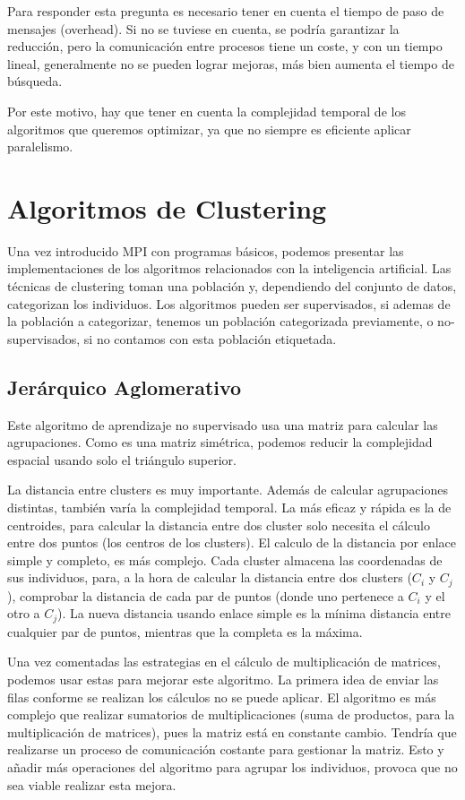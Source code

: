 	Para responder esta pregunta es necesario tener en cuenta el tiempo de paso de mensajes (overhead). Si no se tuviese en cuenta, se podría garantizar la reducción, pero la comunicación entre procesos tiene un coste, y con un tiempo lineal, generalmente no se pueden lograr mejoras, más bien aumenta el tiempo de búsqueda. 
	
	Por este motivo, hay que tener en cuenta la complejidad temporal de los algoritmos que queremos optimizar, ya que no siempre es eficiente aplicar paralelismo.


\section{Algoritmos de Clustering}

	Una vez introducido MPI con programas básicos, podemos presentar las implementaciones de los algoritmos relacionados con la inteligencia artificial. Las técnicas de clustering toman una población y, dependiendo del conjunto de datos, categorizan los individuos. Los algoritmos pueden ser supervisados, si ademas de la población a categorizar, tenemos un población categorizada previamente, o no-supervisados, si no contamos con esta población etiquetada.

	\subsection{Jerárquico Aglomerativo}
	\label{cap:3_2_1}
		Este algoritmo de aprendizaje no supervisado usa una matriz para calcular las agrupaciones. Como es una matriz simétrica, podemos reducir la complejidad espacial usando solo el triángulo superior. 
		
		La distancia entre clusters es muy importante. Además de calcular agrupaciones distintas, también varía la complejidad temporal. La más eficaz y rápida es la de centroides, para calcular la distancia entre dos cluster solo necesita el cálculo entre dos puntos (los centros de los clusters). El calculo de la distancia por enlace simple y completo, es más complejo. Cada cluster almacena las coordenadas de sus individuos, para, a la hora de calcular la distancia entre dos clusters (\(C_{i}\) y \(C_{j}\)), comprobar la distancia de cada par de puntos (donde uno pertenece a \(C_{i}\) y el otro a \(C_{j}\)). La nueva distancia usando enlace simple es la mínima distancia entre cualquier par de puntos, mientras que la completa es la máxima.
		
	
		Una vez comentadas las estrategias en el cálculo de multiplicación de matrices, podemos usar estas para mejorar este algoritmo. La primera idea de enviar las filas conforme se realizan los cálculos no se puede aplicar. El algoritmo es más complejo que realizar sumatorios de multiplicaciones (suma de productos, para la multiplicación de matrices), pues la matriz está en constante cambio. Tendría que realizarse un proceso de comunicación costante para gestionar la matriz. Esto y añadir más operaciones del algoritmo para agrupar los individuos, provoca que no sea viable realizar esta mejora. 
		
